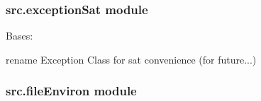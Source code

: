 \documentclass[a4paper,10pt,english]{sphinxmanual}
\begin{document}

\begin{fulllineitems}
\label{commands/apidoc/src:src.environs.print_split_pattern_environs}
\end{fulllineitems}



\subsubsection{src.exceptionSat module}
\label{commands/apidoc/src:module-src.exceptionSat}\label{commands/apidoc/src:src-exceptionsat-module}

\begin{fulllineitems}
\label{commands/apidoc/src:src.exceptionSat.ExceptionSat}
Bases: 

rename Exception Class for sat convenience (for future...)

\end{fulllineitems}



\subsubsection{src.fileEnviron module}
\label{commands/apidoc/src:src-fileenviron-module}\label{commands/apidoc/src:module-src.fileEnviron}
\end{document}
